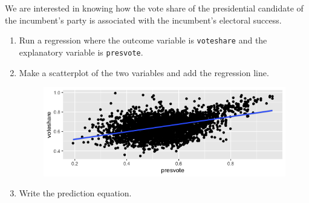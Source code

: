 \documentclass[12pt,letterpaper]{article}
\begin{document}
\noindent We are interested in knowing how the vote share of the presidential candidate of the incumbent's party is associated with the incumbent's electoral success.
	\vspace{.25cm}
	\begin{enumerate}
		\item Run a regression where the outcome variable is \texttt{voteshare} and the explanatory variable is \texttt{presvote}.
			\vspace{2cm}
		
		\item Make a scatterplot of the two variables and add the regression line. 
			\vspace{2cm}
			\begin{figure}[h]
				\centering
				\includegraphics[width=0.7\linewidth]{splot3}
				\caption{}
				\label{fig:splot3}
			\end{figure}
		
		\item Write the prediction equation.
		
	\end{enumerate}
	

\newpage	
\end{document}
